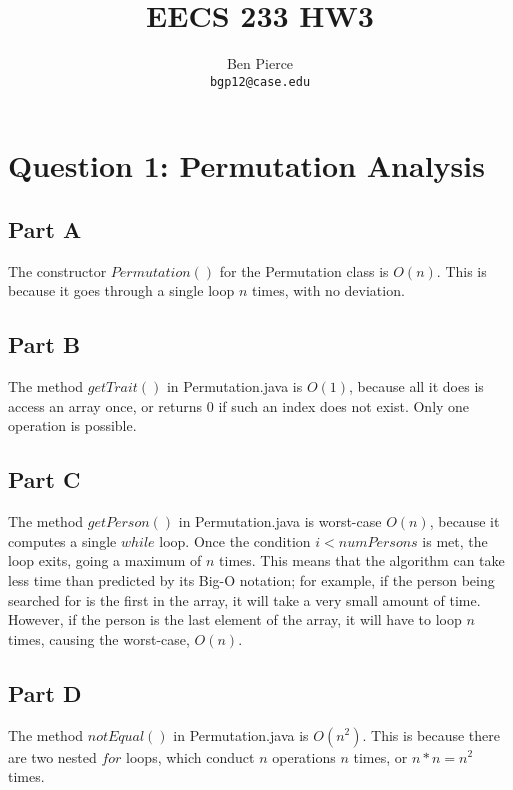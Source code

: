 \documentclass[12pt]{article} %
\title{EECS 233 HW3}
\author{Ben Pierce \\ \texttt{bgp12@case.edu}}
\begin{document}
\maketitle

\section{Question 1: Permutation Analysis}
\subsection{Part A}
The constructor $Permutation()$ for the Permutation class is $O(n)$. This is because it goes through a single loop $n$ times, with no deviation. 

\subsection{Part B}
The method $getTrait()$ in Permutation.java is $O(1)$, because all it does is access an array once, or returns 0 if such an index does not exist. Only one operation is possible.

\subsection{Part C}
The method $getPerson()$ in Permutation.java is worst-case $O(n)$, because it computes a single $while$ loop. Once the condition $i<numPersons$ is met, the loop exits, going a maximum of $n$ times. This means that the algorithm can take less time than predicted by its Big-O notation; for example, if the person being searched for is the first in the array, it will take a very small amount of time. However, if the person is the last element of the array, it will have to loop $n$ times, causing the worst-case, $O(n)$.

\subsection{Part D}
The method $notEqual()$ in Permutation.java is $O(n^2)$. This is because there are two nested $for$ loops, which conduct $n$ operations $n$ times, or $n*n = n^2$ times. 
\end{document}
